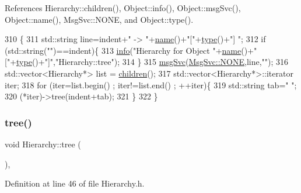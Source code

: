 References Hierarchy\+::children(), Object\+::info(), Object\+::msg\+Svc(), Object\+::name(), Msg\+Svc\+::\+N\+O\+NE, and Object\+::type().


\begin{DoxyCode}
310                                     \{
311   std::string line=indent+\textcolor{stringliteral}{" -> "}+\hyperlink{classObject_a300f4c05dd468c7bb8b3c968868443c1}{name}()+\textcolor{stringliteral}{"["}+\hyperlink{classObject_a84f99f70f144a83e1582d1d0f84e4e62}{type}()+\textcolor{stringliteral}{"] "};
312   \textcolor{keywordflow}{if} (std::string(\textcolor{stringliteral}{""})==indent)\{
313     \hyperlink{classObject_a644fd329ea4cb85f54fa6846484b84a8}{info}(\textcolor{stringliteral}{"Hierarchy for Object "}+\hyperlink{classObject_a300f4c05dd468c7bb8b3c968868443c1}{name}()+\textcolor{stringliteral}{"["}+\hyperlink{classObject_a84f99f70f144a83e1582d1d0f84e4e62}{type}()+\textcolor{stringliteral}{"]"},\textcolor{stringliteral}{"Hierarchy::tree"});
314   \}
315   \hyperlink{classObject_a3f9d5537ebce0c0f2bf6ae4d92426f3c}{msgSvc}(\hyperlink{classMsgSvc_ae671eb7301996cd049d2da8a65925926a9be9ae32fed8e1e6eba4a58692210fbd}{MsgSvc::NONE},line,\textcolor{stringliteral}{""});
316   std::vector<Hierarchy*> list = \hyperlink{classHierarchy_aa9a76f69e98e052ee1a6e32cea006288}{children}();
317   std::vector<Hierarchy*>::iterator iter;
318   \textcolor{keywordflow}{for} (iter=list.begin() ; iter!=list.end() ; ++iter)\{
319     std::string tab=\textcolor{stringliteral}{"  "};
320     (*iter)->tree(indent+tab);
321   \}
322 \}
\end{DoxyCode}
\mbox{\label{classHierarchy_a594c294c5f60c230e106d522ed008212}} 
\subsubsection{\texorpdfstring{tree()}{tree()}\hspace{0.1cm}{\footnotesize\ttfamily [2/2]}}
{\footnotesize\ttfamily void Hierarchy\+::tree (\begin{DoxyParamCaption}{ }\end{DoxyParamCaption})\hspace{0.3cm}{\ttfamily [inline]}, {\ttfamily [inherited]}}



Definition at line 46 of file Hierarchy.\+h.



